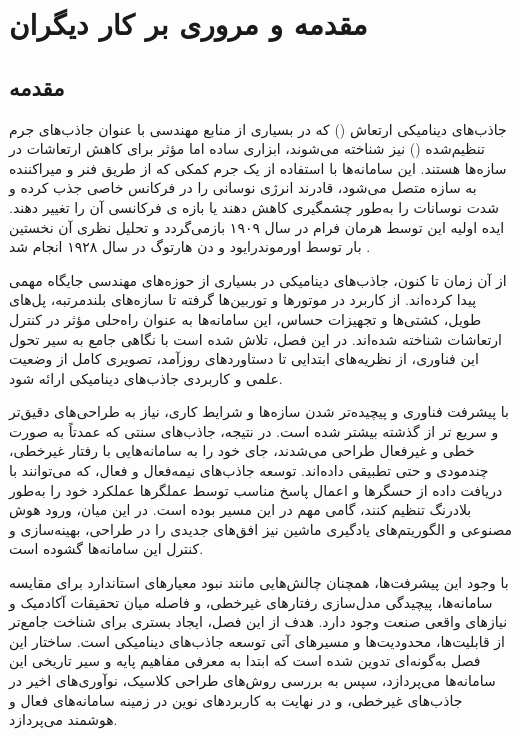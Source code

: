 
\chapter{مقدمه و مروری بر کار دیگران}

\section{مقدمه}

جاذب‌های دینامیکی ارتعاش
()
 که در بسیاری از منابع مهندسی با عنوان
 جاذب‌های جرم تنظیم‌شده ()
  نیز شناخته می‌شوند، ابزاری ساده اما مؤثر برای کاهش ارتعاشات در سازه‌ها هستند. این سامانه‌ها با استفاده از یک جرم کمکی که از طریق فنر و میراکننده به سازه متصل می‌شود، قادرند انرژی نوسانی را در فرکانس خاصی جذب کرده و شدت نوسانات را به‌طور چشمگیری کاهش دهند یا بازه ی فرکانسی آن را تغییر دهند. ایده اولیه این توسط  
 هرمان فرام
   در سال ۱۹۰۹ بازمی‌گردد 
   \cite{frahm1911device}
    و تحلیل نظری آن نخستین بار توسط 
اورموندرایود
     و
دن هارتوگ
در سال ۱۹۲۸ انجام شد 
 \cite{ormondroyd1928theory}.

از آن زمان تا کنون، جاذب‌های دینامیکی در بسیاری از حوزه‌های مهندسی جایگاه مهمی پیدا کرده‌اند. از کاربرد در موتورها و توربین‌ها گرفته تا سازه‌های بلندمرتبه، پل‌های طویل، کشتی‌ها و تجهیزات حساس، این سامانه‌ها به عنوان راه‌حلی مؤثر در کنترل ارتعاشات شناخته شده‌اند. در این فصل، تلاش شده است با نگاهی جامع به سیر تحول این فناوری، از نظریه‌های ابتدایی تا دستاوردهای روزآمد، تصویری کامل از وضعیت علمی و کاربردی جاذب‌های دینامیکی ارائه شود.

با پیشرفت فناوری و پیچیده‌تر شدن سازه‌ها و شرایط کاری، نیاز به طراحی‌های دقیق‌تر و سریع تر از گذشته بیشتر شده است. در نتیجه، جاذب‌های سنتی که عمدتاً به صورت خطی و غیرفعال طراحی می‌شدند، جای خود را به سامانه‌هایی با رفتار غیرخطی، چندمودی و حتی تطبیقی داده‌اند. توسعه جاذب‌های نیمه‌فعال و فعال، که می‌توانند با دریافت داده از حسگرها و اعمال پاسخ مناسب توسط عملگرها عملکرد خود را به‌طور بلادرنگ تنظیم کنند، گامی مهم در این مسیر بوده است. در این میان، ورود هوش مصنوعی و الگوریتم‌های یادگیری ماشین نیز افق‌های جدیدی را در طراحی، بهینه‌سازی و کنترل این سامانه‌ها گشوده است.

با وجود این پیشرفت‌ها، همچنان چالش‌هایی مانند نبود معیارهای استاندارد برای مقایسه سامانه‌ها، پیچیدگی مدل‌سازی رفتارهای غیرخطی، و فاصله میان تحقیقات آکادمیک و نیازهای واقعی صنعت وجود دارد. هدف از این فصل، ایجاد بستری برای شناخت جامع‌تر از قابلیت‌ها، محدودیت‌ها و مسیرهای آتی توسعه جاذب‌های دینامیکی است. ساختار این فصل به‌گونه‌ای تدوین شده است که ابتدا به معرفی مفاهیم پایه و سیر تاریخی این سامانه‌ها می‌پردازد، سپس به بررسی روش‌های طراحی کلاسیک، نوآوری‌های اخیر در جاذب‌های غیرخطی، و در نهایت به کاربردهای نوین در زمینه سامانه‌های فعال و هوشمند می‌پردازد.

